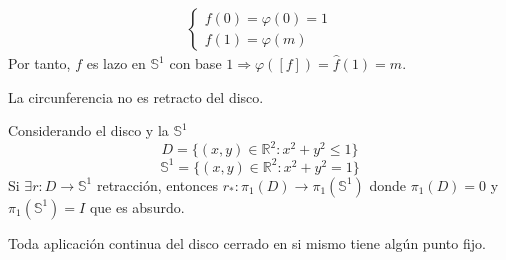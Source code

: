 \begin{dem}
\begin{itemize}
      \[ 
        \begin{aligned}
          \begin{cases}
            f(0) = \varphi(0) = 1 \\
            f(1) = \varphi(m)
          \end{cases}
        \end{aligned} 
      \] 
      Por tanto, $f$ es lazo en $\mathbb{S}^{1}$ con base $1 \Rightarrow \varphi([ f ]) = \hat{ f }(1) = m$.
  \end{itemize}
\end{dem}

\begin{cor}
  La circunferencia no es retracto del disco.
\end{cor}

\begin{dem}
  Considerando el disco y la $\mathbb{S}^{1}$
  \[ 
    D = \{ (x,y) \in \mathbb{R}^{2} : x^{2} + y^{2} \leq 1 \} 
  \] 
  \[ 
    \mathbb{S}^{1} = \{ (x,y) \in \mathbb{R}^{2} : x^{2} + y^{2} = 1 \} 
  \] 
  Si $\exists r : D \to \mathbb{S}^{1}$ retracción, entonces $r_*  : \pi_{1}(D) \to \pi_{1}(\mathbb{S}^{1}) $ donde $\pi_{1}(D) = 0$ y $\pi_{1}(\mathbb{S}^{1}) = I$ que es absurdo.
\end{dem}

\begin{theo}
  Toda aplicación continua del disco cerrado en si mismo tiene algún punto fijo. 
\end{theo}
